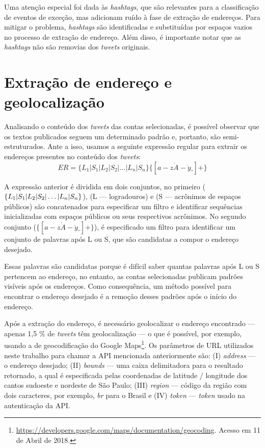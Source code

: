 \documentclass[
	12pt,				%
	oneside,			%
	a4paper,			%
	english,			%
	brazil				%
	]{abntex2ppgsi}
\begin{document}
{{Uma atenção especial foi dada às \textit{hashtags}, que são relevantes para a classificação de eventos de exceção, mas adicionam ruído à fase de extração de endereços. Para mitigar o problema, \textit{hashtags} são identificadas e substituídas por espaços vazios no processo de extração de endereço. Além disso, é importante notar que as \textit{hashtags} não são removias dos \textit{tweets} originais.

\section{Extração de endereço e geolocalização}

Analisando o conteúdo dos \textit{tweets} das contas selecionadas, é possível observar que os textos publicados seguem um determinado padrão e, portanto, são semi-estruturados. Ante a isso, usamos a seguinte expressão regular para extrair os endereços presentes no conteúdo dos \textit{tweets}:
%
\begin{equation}
ER = \lbrace L_1 | S_1 | L_2 | S_2 | \dots | L_n | S_n \rbrace \lbrace [a-z\grave{A}-\ddot{y}\_] + \rbrace
\end{equation}

A expressão anterior é dividida em dois conjuntos, no primeiro ($\lbrace L_1 | S_1 | L_2 | S_2 | \newline \dots | L_n | S_n \rbrace $), (L --- logradouros) e (S --- acrônimos de espaços públicos) são concatenados para especificar um filtro e identificar sequências inicializadas com espaços públicos ou seus respectivos acrônimos. No segundo conjunto ($\lbrace [a-z\grave{A}-\ddot{y}\_] + \rbrace $), é especificado um filtro para identificar um conjunto de palavras após L ou S, que são candidatas a compor o endereço desejado.

Essas palavras são candidatas porque é difícil saber quantas palavras após L ou S pertencem ao endereço, no entanto, as contas selecionadas publicam padrões visíveis após os endereços. Como consequência, um método possível para encontrar o endereço desejado é a remoção desses padrões após o início do endereço.

Após a extração do endereço, é necessário geolocalizar o endereço encontrado --- apenas 1,5 \% de \textit {tweets} têm geolocalização \cite{niu2016community} --- o que é possível, por exemplo, usando a  de geocodificação do Google Maps\footnote {\url {https://developers.google.com/maps/documentation/geocoding}. Acesso em 11 de Abril de 2018.}. Os parâmetros de URL utilizados neste trabalho para chamar a API mencionada anteriormente são: (I) \emph {address} --- o endereço desejado; (II) \emph {bounds} --- uma caixa delimitadora para o resultado retornado, a qual é especificada pelas coordenadas de latitude / longitude dos cantos sudoeste e nordeste de São Paulo; (III) \emph {region} --- código da região com dois caracteres, por exemplo, \textit{br} para o Brasil e (IV) \emph {token} --- \textit{token} usado na autenticação da API.

}}
\end{document}
